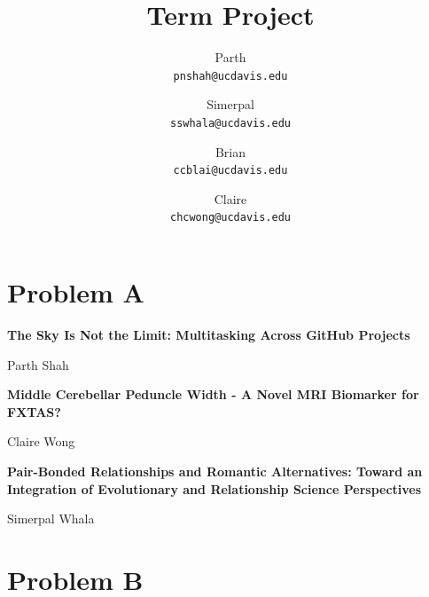 \documentclass[11pt]{article}
\title{Term Project}
\author{Parth\\
\texttt{pnshah@ucdavis.edu}\and Simerpal\\
\texttt{sswhala@ucdavis.edu}\and Brian\\
\texttt{ccblai@ucdavis.edu}\and Claire\\
\texttt{chcwong@ucdavis.edu}}
\begin{document}
\maketitle

\section*{{\LARGE\bfseries Problem A}}

\begin{center}
{\LARGE\bfseries The Sky Is Not the Limit: Multitasking Across GitHub Projects}

Parth Shah
\vspace{1cm}  
\end{center}


\begin{center}
{\LARGE\bfseries Middle Cerebellar Peduncle Width - A Novel MRI Biomarker for FXTAS?}

Claire Wong
\vspace{1cm}  
\end{center}


\begin{center}
{\LARGE\bfseries Pair-Bonded Relationships and
Romantic Alternatives: Toward an
Integration of Evolutionary and
Relationship Science Perspectives}

Simerpal Whala
\vspace{1cm}  
\end{center}


\section*{{\LARGE\bfseries Problem B}}

\\ 

\\
\end{document}
